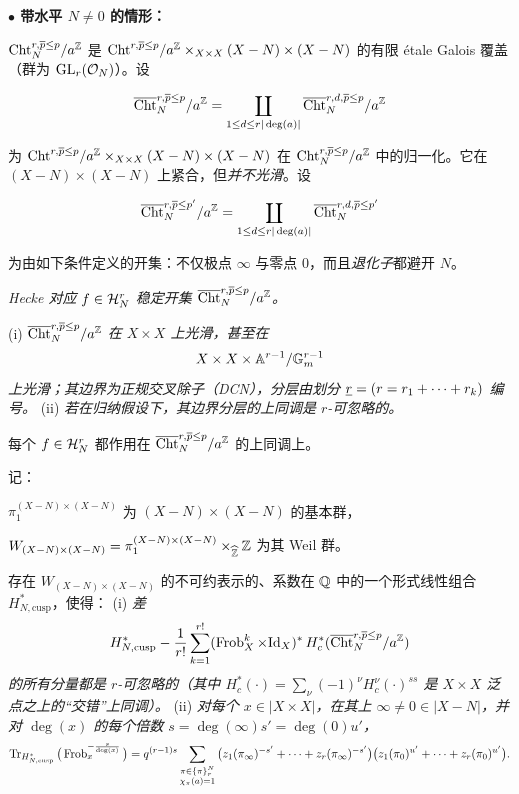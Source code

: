 \par\medskip
\noindent\textbf{$\bullet$ 带水平 $N \neq 0$ 的情形：}

$\mathrm{Cht}^{r,\overline{p}\le p}_N/a^{\mathbb{Z}}$ 是 $\mathrm{Cht}^{r,\overline{p}\le p}/a^{\mathbb{Z}} \times_{X\times X} (X - N) \times (X - N)$ 的有限 étale Galois 覆盖（群为 $\operatorname{GL}_r(\mathcal{O}_N)$）。设

\[ \overline{\mathrm{Cht}}^{r,\overline{p}\le p}_N/a^{\mathbb{Z}} = \coprod_{1 \le d \le r|\deg(a)|} \overline{\mathrm{Cht}}^{r,d,\overline{p}\le p}_N/a^{\mathbb{Z}} \]

为 $\mathrm{Cht}^{r,\overline{p}\le p}/a^{\mathbb{Z}}\times_{X\times X}(X - N)\times(X - N)$ 在 $\mathrm{Cht}^{r,\overline{p}\le p}_N/a^{\mathbb{Z}}$ 中的归一化。它在 $(X - N)\times(X - N)$ 上紧合，但\emph{并不光滑}。设

\[ \overline{\mathrm{Cht}}^{r,\overline{p}\le p'}_N/a^{\mathbb{Z}} = \coprod_{1 \le d \le r|\deg(a)|} \overline{\mathrm{Cht}}^{r,d,\overline{p}\le p'}_N \]

为由如下条件定义的开集：不仅极点 $\infty$ 与零点 $0$，而且\emph{退化子}都避开 $N$。

\begin{theorem*}[稳定性定理]
\emph{Hecke 对应 $f \in \mathcal{H}^r_N$ 稳定开集 $\overline{\mathrm{Cht}}^{r,\overline{p}\le p}_N/a^{\mathbb{Z}}$。}
\end{theorem*}

\begin{proposition*}
\upshape (i) \emph{$\overline{\mathrm{Cht}}^{r,\overline{p}\le p}_N/a^{\mathbb{Z}}$ 在 $X \times X$ 上光滑，甚至在}
\[ X \times X \times \mathbb{A}^{r-1}/\mathbb{G}_m^{r-1} \]
\emph{上光滑；其边界为正规交叉除子（DCN），分层由划分 $\ul{r} = (r = r_1 + \cdots + r_k)$ 编号。}
\upshape (ii) \emph{若在归纳假设下，其边界分层的上同调是 $r$-可忽略的。}
\end{proposition*}


\begin{corollary*}
每个 $f \in \mathcal{H}^r_N$ 都作用在 $\overline{\mathrm{Cht}}^{r,\overline{p}\le p}_N/a^{\mathbb{Z}}$ 的上同调上。
\end{corollary*}

记：

$\pi_1^{(X-N)\times(X-N)}$ 为 $(X - N) \times (X - N)$ 的基本群，

$W_{(X-N)\times(X-N)} = \pi_1^{(X-N)\times(X-N)} \times_{\widehat{\mathbb{Z}}} \mathbb{Z}$ 为其 Weil 群。

\begin{lemma*}
存在 $W_{(X-N)\times(X-N)}$ 的不可约表示的、系数在 $\mathbb{Q}$ 中的一个形式线性组合 $H^*_{N,\mathrm{cusp}}$，使得：
\upshape (i) \emph{差}
\[ H^*_{N,\mathrm{cusp}} - \frac{1}{r!}\sum_{k=1}^{r!} (\operatorname{Frob}_X^k \times \mathrm{Id}_X)^*\, H^*_c(\overline{\mathrm{Cht}}^{r,\overline{p}\le p}_N/a^{\mathbb{Z}}) \]
\emph{的所有分量都是 $r$-可忽略的（其中 $H^*_c(\cdot) = \sum_\nu (-1)^\nu H^\nu_c(\cdot)^{ss}$ 是 $X \times X$ 泛点之上的“交错”上同调）。}
\upshape (ii) \emph{对每个 $x \in |X \times X|$，在其上 $\infty \neq 0 \in |X - N|$，并对 $\deg(x)$ 的每个倍数 $s = \deg(\infty)s' = \deg(0)u'$，}
\[ \operatorname{Tr}_{H^*_{N,\mathrm{cusp}}}\big(\operatorname{Frob}_x^{-\frac{s}{\deg(x)}}\big) = q^{(r-1)s} \sum_{\substack{\pi \in \{\pi\}^N_r\\ \chi_\pi(a) = 1}} \big(z_1(\pi_\infty)^{-s'} + \cdots + z_r(\pi_\infty)^{-s'}\big)\big(z_1(\pi_0)^{u'} + \cdots + z_r(\pi_0)^{u'}\big). \]
\end{lemma*}


